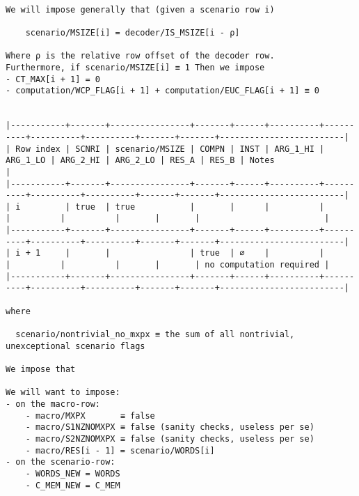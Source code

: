 \documentclass[varwidth=\maxdimen,margin=0.5cm,multi={verbatim}]{standalone}
\begin{document}
\begin{verbatim}

We will impose generally that (given a scenario row i)

	scenario/MSIZE[i] = decoder/IS_MSIZE[i - ρ]

Where ρ is the relative row offset of the decoder row.
Furthermore, if scenario/MSIZE[i] ≡ 1 Then we impose
- CT_MAX[i + 1] = 0
- computation/WCP_FLAG[i + 1] + computation/EUC_FLAG[i + 1] ≡ 0


|-----------+-------+----------------+-------+------+----------+----------+----------+----------+-------+-------+-------------------------|
| Row index | SCNRI | scenario/MSIZE | COMPN | INST | ARG_1_HI | ARG_1_LO | ARG_2_HI | ARG_2_LO | RES_A | RES_B | Notes                   |
|-----------+-------+----------------+-------+------+----------+----------+----------+----------+-------+-------+-------------------------|
| i         | true  | true           |       |      |          |          |          |          |       |       |                         |
|-----------+-------+----------------+-------+------+----------+----------+----------+----------+-------+-------+-------------------------|
| i + 1     |       |                | true  | ∅    |          |          |          |          |       |       | no computation required |
|-----------+-------+----------------+-------+------+----------+----------+----------+----------+-------+-------+-------------------------|

where 

  scenario/nontrivial_no_mxpx ≡ the sum of all nontrivial, unexceptional scenario flags

We impose that

We will want to impose:
- on the macro-row:
	- macro/MXPX       ≡ false
	- macro/S1NZNOMXPX ≡ false (sanity checks, useless per se)
	- macro/S2NZNOMXPX ≡ false (sanity checks, useless per se)
	- macro/RES[i - 1] = scenario/WORDS[i]
- on the scenario-row:
	- WORDS_NEW = WORDS
	- C_MEM_NEW = C_MEM

\end{verbatim}
\end{document}
